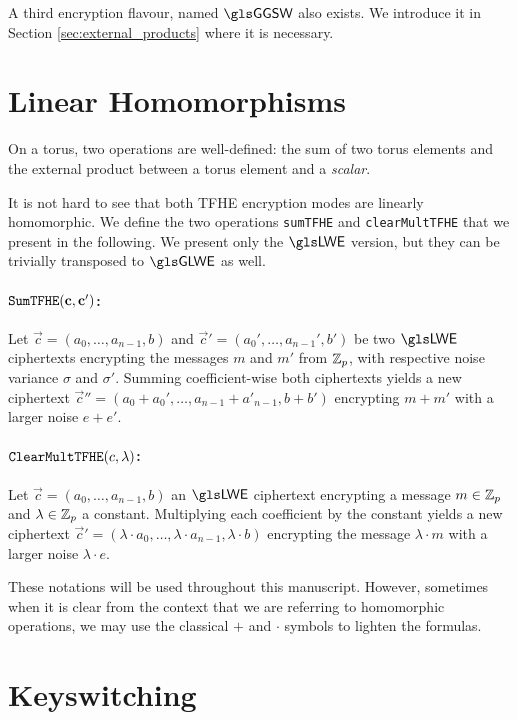 A third encryption flavour, named $\GGSW$ also exists. We introduce it in Section \ref{sec:external_products} where it is necessary.


\section{Linear Homomorphisms}

On a torus, two operations are well-defined: the sum of two torus elements and the external product between a torus element and a \textit{scalar}.

It is not hard to see that both \gls{TFHE} encryption modes are linearly homomorphic. We define the two operations \texttt{sumTFHE} and \texttt{clearMultTFHE} that we present in the following. We present only the $\LWE$ version, but they can be trivially transposed to $\GLWE$ as well.


\paragraph{$\texttt{SumTFHE}(\mathbf c, \mathbf c')$:} Let $\vec c = (a_0, \dots, a_{n-1}, b)$ and $\vec c' = (a_0', \dots, a_{n-1}', b')$ be two $\LWE$ ciphertexts encrypting the messages $m$ and $m'$ from $\mathbb{Z}_p$, with respective noise variance $\sigma$ and $\sigma'$. Summing coefficient-wise both ciphertexts yields a new ciphertext $\vec c'' = (a_0 + a_0', \dots, a_{n-1} + a'_{n-1}, b + b')$ encrypting $m + m'$ with a larger noise $e + e'$.


\paragraph{$\texttt{ClearMultTFHE}(c, \lambda)$:} Let $\vec c = (a_0, \dots, a_{n-1}, b)$ an $\LWE$ ciphertext encrypting a message $m \in \mathbb{Z}_p$ and $\lambda \in \mathbb{Z}_p$ a constant. Multiplying each coefficient by the constant yields a new ciphertext $\vec c' = (\lambda \cdot a_0, \dots, \lambda \cdot a_{n-1}, \lambda \cdot b)$ encrypting the message $\lambda \cdot m$ with a larger noise $\lambda \cdot e$.


\medskip
These notations will be used throughout this manuscript. However, sometimes when it is clear from the context that we are referring to homomorphic operations, we may use the classical $+$ and $\cdot$ symbols to lighten the formulas.





\section{Keyswitching}
\label{sec:keyswitch}


